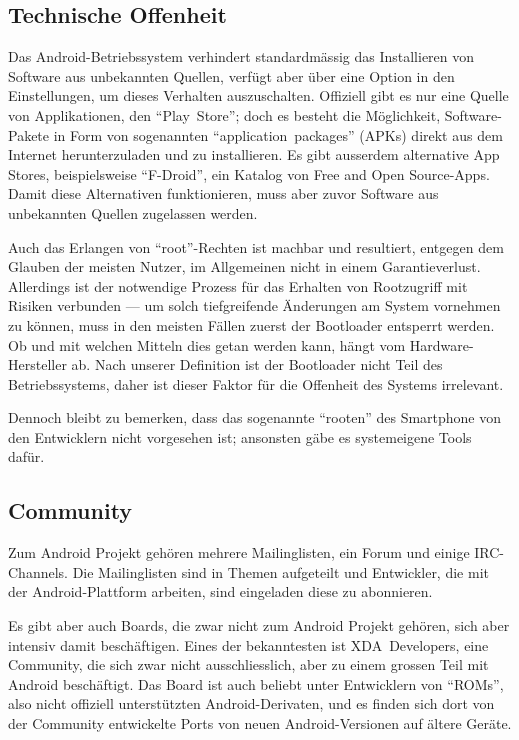 \subsection{Technische Offenheit}
Das \mbox{Android-Betriebssystem} verhindert standardmässig das Installieren von Software aus unbekannten Quellen, verfügt aber über eine Option in den Einstellungen, um dieses Verhalten auszuschalten. Offiziell gibt es nur eine Quelle von Applikationen, den ``\mbox{Play Store}''; doch es besteht die Möglichkeit, \mbox{Software-Pakete} in Form von sogenannten ``\mbox{application packages}'' (APKs) direkt aus dem Internet herunterzuladen und zu installieren. Es gibt ausserdem alternative App Stores, beispielsweise ``\mbox{F-Droid}'', ein Katalog von Free and Open \mbox{Source-Apps}\thinspace\cite{online:f-droid}. Damit diese Alternativen funktionieren, muss aber zuvor Software aus unbekannten Quellen zugelassen werden.

Auch das Erlangen von \mbox{``root''-Rechten} ist machbar und resultiert, entgegen dem Glauben der meisten Nutzer, im Allgemeinen nicht in einem Garantieverlust\thinspace\cite{online:xda-rooting-warranty}. Allerdings ist der notwendige Prozess für das Erhalten von Rootzugriff mit Risiken verbunden --- um solch tiefgreifende Änderungen am System vornehmen zu können, muss in den meisten Fällen zuerst der Bootloader entsperrt werden. 
Ob und mit welchen Mitteln dies getan werden kann, hängt vom Hardware-Hersteller ab\thinspace\cite{online:apu-what-is-unlocking}. Nach unserer Definition ist der Bootloader nicht Teil des Betriebssystems, daher ist dieser Faktor für die Offenheit des Systems irrelevant.

Dennoch bleibt zu bemerken, dass das sogenannte ``rooten'' des Smartphone von den Entwicklern nicht vorgesehen ist; ansonsten gäbe es systemeigene Tools dafür.
\newline

\subsection{Community}
Zum Android Projekt gehören mehrere Mailinglisten, ein Forum und einige \mbox{IRC-Channels}\thinspace\cite{online:android-community}. Die Mailinglisten sind in Themen aufgeteilt und Entwickler, die mit der \mbox{Android-Plattform} arbeiten, sind eingeladen diese zu abonnieren\thinspace\cite{online:android-community}.

Es gibt aber auch Boards, die zwar nicht zum Android Projekt gehören, sich aber intensiv damit beschäftigen. Eines der bekanntesten ist \mbox{XDA Developers}\thinspace\cite{online:xda-developers}, eine Community, die sich zwar nicht ausschliesslich, aber zu einem grossen Teil mit Android beschäftigt. Das Board ist auch beliebt unter Entwicklern von ``ROMs'', also nicht offiziell unterstützten Android-Derivaten, und es finden sich dort von der Community entwickelte Ports von neuen Android-Versionen auf ältere Geräte.
\newline

